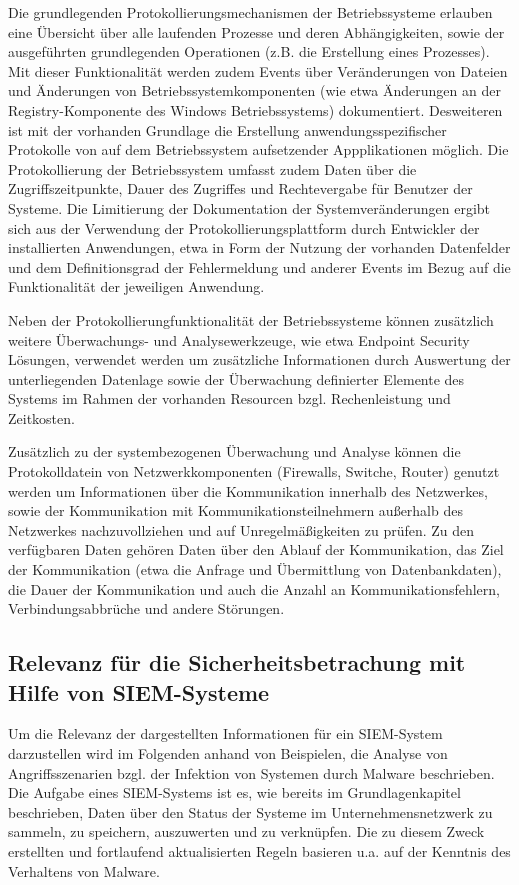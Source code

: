 Die grundlegenden Protokollierungsmechanismen der Betriebssysteme erlauben eine Übersicht über alle laufenden Prozesse und deren Abhängigkeiten, sowie der ausgeführten grundlegenden Operationen (z.B. die Erstellung eines Prozesses). Mit dieser Funktionalität werden zudem Events über Veränderungen von Dateien und Änderungen von Betriebssystemkomponenten (wie etwa Änderungen an der Registry-Komponente des Windows Betriebssystems) dokumentiert. Desweiteren ist mit der vorhanden Grundlage die Erstellung anwendungsspezifischer Protokolle von auf dem Betriebssystem aufsetzender Appplikationen möglich. Die Protokollierung der Betriebssystem umfasst zudem Daten über die Zugriffszeitpunkte, Dauer des Zugriffes und Rechtevergabe für Benutzer der Systeme. 
Die Limitierung der Dokumentation der Systemveränderungen ergibt sich aus der Verwendung der Protokollierungsplattform durch Entwickler der installierten Anwendungen, etwa in Form der Nutzung der vorhanden Datenfelder und dem Definitionsgrad der Fehlermeldung und anderer Events im Bezug auf die Funktionalität der jeweiligen Anwendung. 

Neben der Protokollierungfunktionalität der Betriebssysteme können zusätzlich weitere Überwachungs- und Analysewerkzeuge, wie etwa Endpoint Security Lösungen, verwendet werden um zusätzliche Informationen durch Auswertung der unterliegenden Datenlage sowie der Überwachung definierter Elemente des Systems im Rahmen der vorhanden Resourcen bzgl. Rechenleistung und Zeitkosten. 

Zusätzlich zu der systembezogenen Überwachung und Analyse können die Protokolldatein von Netzwerkkomponenten (Firewalls, Switche, Router) genutzt werden um Informationen über die Kommunikation innerhalb des Netzwerkes, sowie der Kommunikation mit Kommunikationsteilnehmern außerhalb des Netzwerkes nachzuvollziehen und auf Unregelmäßigkeiten zu prüfen. Zu den verfügbaren Daten gehören Daten über den Ablauf der Kommunikation, das Ziel der Kommunikation (etwa die Anfrage und Übermittlung von Datenbankdaten), die Dauer der Kommunikation und auch die Anzahl an Kommunikationsfehlern, Verbindungsabbrüche und andere Störungen. 


\subsection{Relevanz für die Sicherheitsbetrachung mit Hilfe von SIEM-Systeme}
Um die Relevanz der dargestellten Informationen für ein SIEM-System darzustellen wird im Folgenden anhand von Beispielen, die Analyse von Angriffsszenarien bzgl. der Infektion von Systemen durch Malware beschrieben. Die Aufgabe eines SIEM-Systems ist es, wie bereits im Grundlagenkapitel beschrieben, Daten über den Status der Systeme im Unternehmensnetzwerk zu sammeln, zu speichern, auszuwerten und zu verknüpfen. Die zu diesem Zweck erstellten und fortlaufend aktualisierten Regeln basieren u.a. auf der Kenntnis des Verhaltens von Malware.

